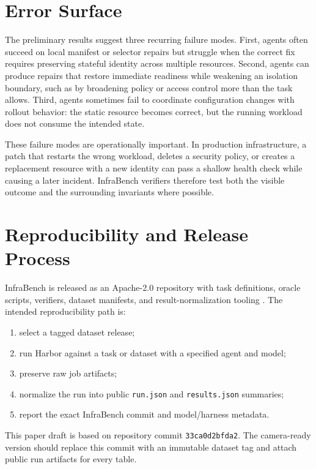 \documentclass[11pt]{article}
\begin{document}
\section{Error Surface}

The preliminary results suggest three recurring failure modes. First, agents
often succeed on local manifest or selector repairs but struggle when the
correct fix requires preserving stateful identity across multiple resources.
Second, agents can produce repairs that restore immediate readiness while
weakening an isolation boundary, such as by broadening policy or access control
more than the task allows. Third, agents sometimes fail to coordinate
configuration changes with rollout behavior: the static resource becomes
correct, but the running workload does not consume the intended state.

These failure modes are operationally important. In production infrastructure,
a patch that restarts the wrong workload, deletes a security policy, or creates
a replacement resource with a new identity can pass a shallow health check
while causing a later incident. InfraBench verifiers therefore test both the
visible outcome and the surrounding invariants where possible.

\section{Reproducibility and Release Process}

InfraBench is released as an Apache-2.0 repository with task definitions,
oracle scripts, verifiers, dataset manifests, and result-normalization tooling
\cite{infrabench2026}. The intended reproducibility path is:

\begin{enumerate}
  \item select a tagged dataset release;
  \item run Harbor against a task or dataset with a specified agent and model;
  \item preserve raw job artifacts;
  \item normalize the run into public \texttt{run.json} and \texttt{results.json}
  summaries;
  \item report the exact InfraBench commit and model/harness metadata.
\end{enumerate}

This paper draft is based on repository commit \texttt{33ca0d2bfda2}. The
camera-ready version should replace this commit with an immutable dataset tag
and attach public run artifacts for every table.
\end{document}
